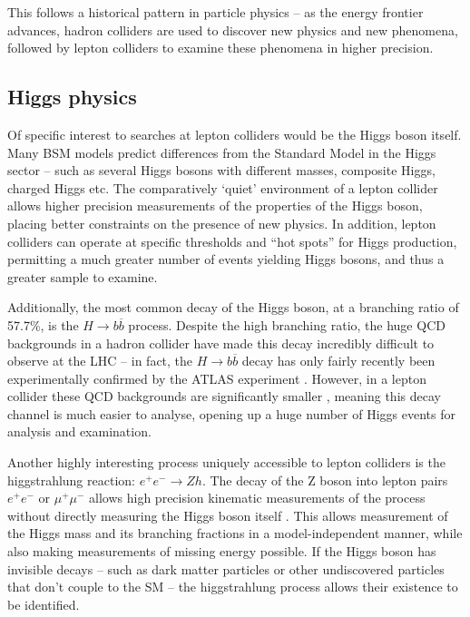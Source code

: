 This follows a historical pattern in particle physics -- as the energy frontier advances, hadron colliders are used to discover new physics and new phenomena, followed by lepton colliders to examine these phenomena in higher precision.

\subsection{Higgs physics}
Of specific interest to searches at lepton colliders would be the Higgs boson itself. Many \acrshort{BSM} models predict differences from the Standard Model in the Higgs sector -- such as several Higgs bosons with different masses, composite Higgs, charged Higgs etc. The comparatively `quiet' environment of a lepton collider allows higher precision measurements of the properties of the Higgs boson, placing better constraints on the presence of new physics. In addition, lepton colliders can operate at specific thresholds and ``hot spots'' for Higgs production, permitting a much greater number of events yielding Higgs bosons, and thus a greater sample to examine.

Additionally, the most common decay of the Higgs boson, at a branching ratio of 57.7\%, is the $H \rightarrow b \overline{b}$ process. Despite the high branching ratio, the huge \acrshort{QCD} backgrounds in a hadron collider have made this decay incredibly difficult to observe at the LHC -- in fact, the $H \rightarrow b \overline{b}$ decay has only fairly recently been experimentally confirmed by the \acrshort{ATLAS} experiment \cite{hbb-atlas}. However, in a lepton collider these \acrshort{QCD} backgrounds are significantly smaller \cite{ilc-tdr-physics}, meaning this decay channel is much easier to analyse, opening up a huge number of Higgs events for analysis and examination.

Another highly interesting process uniquely accessible to lepton colliders is the higgstrahlung reaction: $e^+ e^- \rightarrow Zh$. The decay of the Z boson into lepton pairs $e^+ e^-$ or $\mu^+ \mu^-$ allows high precision kinematic measurements of the process without directly measuring the Higgs boson itself \cite{ilc-tdr-physics}. This allows measurement of the Higgs mass and its branching fractions in a model-independent manner, while also making measurements of missing energy possible. If the Higgs boson has invisible decays -- such as dark matter particles or other undiscovered particles that don't couple to the \acrshort{SM} -- the higgstrahlung process allows their existence to be identified.

